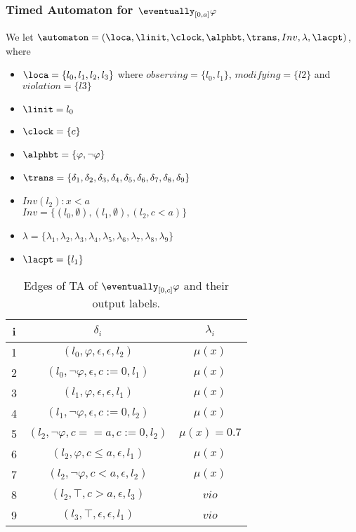 \subsubsection{Timed Automaton for $\eventually_{[0,a]}\varphi$}
        We let $\automaton=(\loca,\linit,\clock,\allowbreak\alphbt,\trans, Inv, \lambda, \lacpt)$, where
        \begin{itemize}
            \item $\loca=\{l_0, l_1, l_2, l_3\}$ where $observing=\{l_0, l_1\}$, $modifying=\{l2\}$ and $violation=\{l3\}$
            \item $\linit=l_0$ 
            \item $\clock=\{c\}$
            \item $\allowbreak\alphbt=\{\varphi, \neg \varphi\}$
            \item $\trans=\{ \delta_1, \delta_2, \delta_3,\delta_4, \delta_5, \delta_6, \delta_7, \delta_8,\delta_9 \}$
            \item \sout{$Inv(l_2): x<a$} \\
            $Inv=\{(l_0,\emptyset),(l_1,\emptyset), (l_2, c<a)\}$
            \item $\lambda=\{\lambda_1, \lambda_2, \lambda_3, \lambda_4, \lambda_5, \lambda_6, \lambda_7, \lambda_8, \lambda_9\}$
            \item \sout{$\lacpt=\{l_1\}$}
        \end{itemize}

        \begin{table}[H]
        \begin{tabular}{@{}ccc@{}}
        \hline
        i & $\delta_i$                   & $\lambda_i$ \\ \hline
        1 & $(l_0, \varphi, \epsilon, \epsilon, l_2)$ & $\mu(x)$  \\ 
        2 & $(l_0, \neg \varphi, \epsilon, c:=0, l_1)$ & $\mu(x)$  \\ 
        3 & $(l_1, \varphi, \epsilon, \epsilon, l_1)$ & $\mu(x)$  \\ 
        4 & $(l_1, \neg \varphi, \epsilon, c:=0, l_2)$ & $\mu(x)$  \\ 
        5 & $(l_2, \neg \varphi, c==a, c:=0, l_2)$ & $\mu(x)=0.7$  \\ 
        6 & $(l_2, \varphi, c \leq a, \epsilon, l_1)$ & $\mu(x)$  \\ 
        7 & $(l_2, \neg \varphi, c<a, \epsilon, l_2)$ & $\mu(x)$  \\ 
        8 & $(l_2, \top, c>a, \epsilon, l_3)$ & $vio$  \\ 
        9 & $(l_3, \top, \epsilon, \epsilon, l_1)$ & $vio$  \\ \bottomrule
        \end{tabular}
        \caption
        {Edges of TA of $\eventually_{[0,c]}\varphi$ and their output labels.}
        \end{table}


